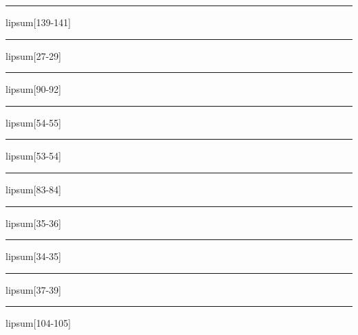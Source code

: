 \documentclass[11pt,a4paper]{article}
\begin{document}
\begin{simplewrap}
  \textcolor{orange!27}{\rule{5.3cm}{8.6cm}}
\end{simplewrap}
lipsum[139-141]

\begin{simplewrap}
  \textcolor{blue!58}{\rule{5.2cm}{6.4cm}}
\end{simplewrap}
lipsum[27-29]

\begin{simplewrap}
  \textcolor{magenta!29}{\rule{5.6cm}{2.3cm}}
\end{simplewrap}
lipsum[90-92]

\begin{simplewrap}
  \textcolor{green!38}{\rule{5.6cm}{2.9cm}}
\end{simplewrap}
lipsum[54-55]

\begin{simplewrap}
  \textcolor{lime!55}{\rule{4.8cm}{5.4cm}}
\end{simplewrap}
lipsum[53-54]

\begin{simplewrap}
  \textcolor{blue!46}{\rule{4.1cm}{4.2cm}}
\end{simplewrap}
lipsum[83-84]

\begin{simplewrap}
  \textcolor{violet!28}{\rule{4.7cm}{9.6cm}}
\end{simplewrap}
lipsum[35-36]

\begin{simplewrap}
  \textcolor{olive!13}{\rule{6.0cm}{8.9cm}}
\end{simplewrap}
lipsum[34-35]

\begin{simplewrap}
  \textcolor{brown!25}{\rule{5.3cm}{7.4cm}}
\end{simplewrap}
lipsum[37-39]

\begin{simplewrap}
  \textcolor{teal!50}{\rule{4.2cm}{5.6cm}}
\end{simplewrap}
lipsum[104-105]
\end{document}
